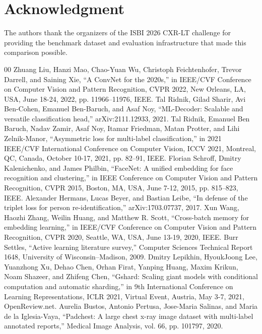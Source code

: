 \documentclass[conference]{IEEEtran}
\begin{document}
\section*{Acknowledgment}
The authors thank the organizers of the ISBI 2026 CXR-LT challenge for providing the benchmark dataset and evaluation infrastructure that made this comparison possible.

\begin{thebibliography}{00}
 Zhuang Liu, Hanzi Mao, Chao-Yuan Wu, Christoph Feichtenhofer, Trevor Darrell, and Saining Xie, ``A ConvNet for the 2020s,'' in IEEE/CVF Conference on Computer Vision and Pattern Recognition, CVPR 2022, New Orleans, LA, USA, June 18-24, 2022, pp. 11966--11976, IEEE.
 Tal Ridnik, Gilad Sharir, Avi Ben-Cohen, Emanuel Ben-Baruch, and Asaf Noy, ``ML-Decoder: Scalable and versatile classification head,'' arXiv:2111.12933, 2021.
 Tal Ridnik, Emanuel Ben Baruch, Nadav Zamir, Asaf Noy, Itamar Friedman, Matan Protter, and Lihi Zelnik-Manor, ``Asymmetric loss for multi-label classification,'' in 2021 IEEE/CVF International Conference on Computer Vision, ICCV 2021, Montreal, QC, Canada, October 10-17, 2021, pp. 82--91, IEEE.
 Florian Schroff, Dmitry Kalenichenko, and James Philbin, ``FaceNet: A unified embedding for face recognition and clustering,'' in IEEE Conference on Computer Vision and Pattern Recognition, CVPR 2015, Boston, MA, USA, June 7-12, 2015, pp. 815--823, IEEE.
 Alexander Hermans, Lucas Beyer, and Bastian Leibe, ``In defense of the triplet loss for person re-identification,'' arXiv:1703.07737, 2017.
 Xun Wang, Haozhi Zhang, Weilin Huang, and Matthew R. Scott, ``Cross-batch memory for embedding learning,'' in IEEE/CVF Conference on Computer Vision and Pattern Recognition, CVPR 2020, Seattle, WA, USA, June 13-19, 2020, IEEE.
 Burr Settles, ``Active learning literature survey,'' Computer Sciences Technical Report 1648, University of Wisconsin--Madison, 2009.
 Dmitry Lepikhin, HyoukJoong Lee, Yuanzhong Xu, Dehao Chen, Orhan Firat, Yanping Huang, Maxim Krikun, Noam Shazeer, and Zhifeng Chen, ``Gshard: Scaling giant models with conditional computation and automatic sharding,'' in 9th International Conference on Learning Representations, ICLR 2021, Virtual Event, Austria, May 3-7, 2021, OpenReview.net.
 Aurelia Bustos, Antonio Pertusa, Jose-Maria Salinas, and Maria de la Iglesia-Vaya, ``Padchest: A large chest x-ray image dataset with multi-label annotated reports,'' Medical Image Analysis, vol. 66, pp. 101797, 2020.

\end{thebibliography}
\end{document}

